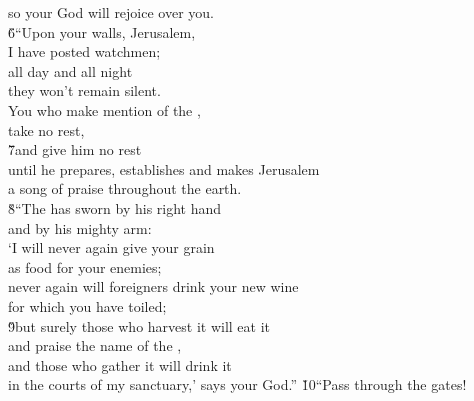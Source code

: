 \begin{poetry}
\poemll    so your God will rejoice over you. \\
\poeml \v{6}``Upon your walls, Jerusalem, \\
\poemll    I have posted watchmen; \\
\poeml all day and all night \\
\poemll    they won't remain silent. \\
\poeml You who make mention of the , \\
\poemll    take no rest, \\
\poeml \v{7}and give him no rest \\
\poemll    until he prepares, establishes and makes Jerusalem \\
\poemlll       a song of praise throughout the earth. \\
\poeml \v{8}``The  has sworn by his right hand \\
\poemll    and by his mighty arm: \\
\poeml `I will never again give your grain \\
\poemll    as food for your enemies; \\
\poeml never again will foreigners drink your new wine \\
\poemll    for which you have toiled; \\
\poeml \v{9}but surely those who harvest it will eat it \\
\poemll    and praise the name of the , \\
\poeml and those who gather it will drink it \\
\poemll    in the courts of my sanctuary,' says your God.''
\poeml \v{10}``Pass through the gates! \\

\end{poetry}
